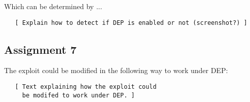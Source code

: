 \documentclass[10pt]{article}
\begin{document}
      Which can be determined by ...

      \begin{verbatim}
   [ Explain how to detect if DEP is enabled or not (screenshot?) ]
      \end{verbatim}


    \subsection{Assignment 7}

      The exploit could be modified in the following way to work under DEP:

      \begin{verbatim}
   [ Text explaining how the exploit could
     be modifed to work under DEP. ]
      \end{verbatim}
\end{document}
